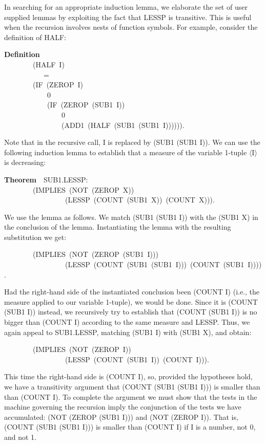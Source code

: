 \documentclass[10pt]{book}
\newenvironment{pubasis}{\begin{flushleft}}{\end{flushleft}}
\newcommand{\axiomordefinition}[1]{\vspace{6pt}\Large\textsf{\textbf{#1}}\normalsize}
\begin{document}
In searching for an appropriate induction lemma, we elaborate the set of
user supplied lemmas by exploiting the fact that LESSP is transitive.
This is useful when the recursion involves nests of function symbols.
For example, consider the definition of HALF:
\begin{pubasis}
\axiomordefinition{Definition}\\
~~~~~~~~(HALF~I)\\
~~~~~~~~~~~=\\
~~~~~~~~(IF~(ZEROP~I)\\
~~~~~~~~~~~~0\\
~~~~~~~~~~~~(IF~(ZEROP~(SUB1~I))\\
~~~~~~~~~~~~~~~~0\\
~~~~~~~~~~~~~~~~(ADD1~(HALF~(SUB1~(SUB1~I)))))).\\
\end{pubasis}
Note that in the recursive call, I is replaced by (SUB1 (SUB1 I)).
We can use the following induction lemma to establish that a measure of
the variable 1-tuple $\langle$I$\rangle$ is
decreasing:
\begin{pubasis}
\axiomordefinition{Theorem}~~SUB1.LESSP:\\
~~~~~~~~(IMPLIES~(NOT~(ZEROP~X))\\
~~~~~~~~~~~~~~~~~(LESSP~(COUNT~(SUB1~X))~(COUNT~X))).\\
\end{pubasis}
We use the lemma as follows.
We match (SUB1 (SUB1 I)) with the (SUB1 X) in the conclusion of the
lemma.  Instantiating the lemma with the resulting substitution we get:
\begin{pubasis}
~~~~~~~~(IMPLIES~(NOT~(ZEROP~(SUB1~I)))\\
~~~~~~~~~~~~~~~~~(LESSP~(COUNT~(SUB1~(SUB1~I)))~(COUNT~(SUB1~I)))).\\
\end{pubasis}
Had the right-hand side of the instantiated conclusion been (COUNT I)
(i.e., the measure applied to our variable 1-tuple), we would be
done.  Since it is (COUNT (SUB1 I)) instead, we recursively try to establish
that (COUNT (SUB1 I)) is no bigger than (COUNT I) according to the same measure and
LESSP.
Thus, we again appeal to SUB1.LESSP, matching (SUB1 I) with (SUB1 X), and
obtain:
\begin{pubasis}
~~~~~~~~(IMPLIES~(NOT~(ZEROP~I))\\
~~~~~~~~~~~~~~~~~(LESSP~(COUNT~(SUB1~I))~(COUNT~I))).\\
\end{pubasis}
This time the right-hand side is (COUNT I), so, provided the hypotheses
hold, we have a transitivity argument that (COUNT (SUB1 (SUB1 I))) is smaller than
than (COUNT I).  To complete the argument we must show
that the tests in the machine governing the recursion imply
the conjunction of the tests we have accumulated:  (NOT (ZEROP (SUB1 I)))
and (NOT (ZEROP I)).  That is,  (COUNT (SUB1 (SUB1 I))) is
smaller than (COUNT I) if I
is a number, not 0, and not 1.
\end{document}
